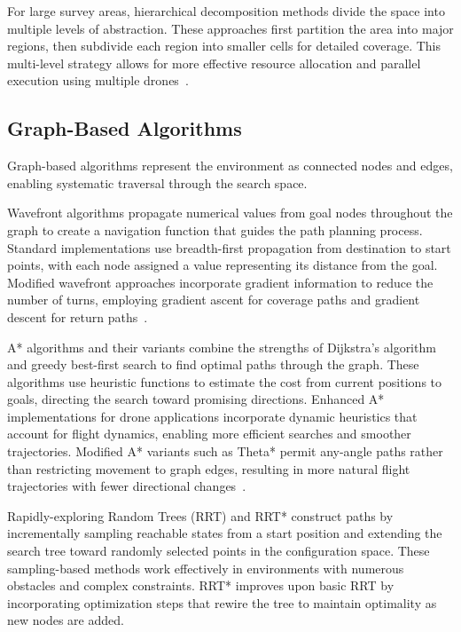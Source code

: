 For large survey areas, hierarchical decomposition methods divide the space into multiple levels of abstraction. These approaches first partition the area into major regions, then subdivide each region into smaller cells for detailed coverage. This multi-level strategy allows for more effective resource allocation and parallel execution using multiple drones~\cite{cabreira2019survey}.


\subsection{Graph-Based Algorithms}

Graph-based algorithms represent the environment as connected nodes and edges, enabling systematic traversal through the search space.

Wavefront algorithms propagate numerical values from goal nodes throughout the graph to create a navigation function that guides the path planning process. Standard implementations use breadth-first propagation from destination to start points, with each node assigned a value representing its distance from the goal. Modified wavefront approaches incorporate gradient information to reduce the number of turns, employing gradient ascent for coverage paths and gradient descent for return paths~\cite{cabreira2019survey}.

A* algorithms and their variants combine the strengths of Dijkstra's algorithm and greedy best-first search to find optimal paths through the graph. These algorithms use heuristic functions to estimate the cost from current positions to goals, directing the search toward promising directions. Enhanced A* implementations for drone applications incorporate dynamic heuristics that account for flight dynamics, enabling more efficient searches and smoother trajectories. Modified A* variants such as Theta* permit any-angle paths rather than restricting movement to graph edges, resulting in more natural flight trajectories with fewer directional changes~\cite{OptimizationUAV}.

Rapidly-exploring Random Trees (RRT) and RRT* construct paths by incrementally sampling reachable states from a start position and extending the search tree toward randomly selected points in the configuration space. These sampling-based methods work effectively in environments with numerous obstacles and complex constraints. RRT* improves upon basic RRT by incorporating optimization steps that rewire the tree to maintain optimality as new nodes are added.

